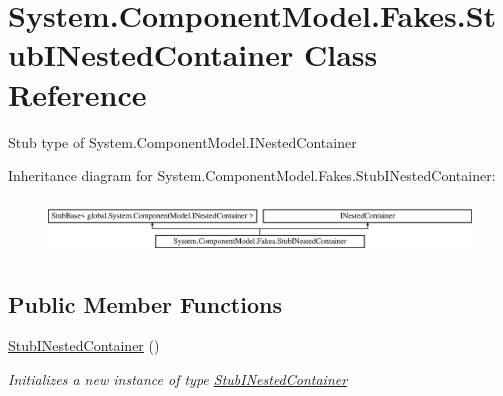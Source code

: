 \hypertarget{class_system_1_1_component_model_1_1_fakes_1_1_stub_i_nested_container}{\section{System.\-Component\-Model.\-Fakes.\-Stub\-I\-Nested\-Container Class Reference}
\label{class_system_1_1_component_model_1_1_fakes_1_1_stub_i_nested_container}
}


Stub type of System.\-Component\-Model.\-I\-Nested\-Container 


Inheritance diagram for System.\-Component\-Model.\-Fakes.\-Stub\-I\-Nested\-Container\-:\begin{figure}[H]
\begin{center}
\leavevmode
\includegraphics[height=1.481482cm]{class_system_1_1_component_model_1_1_fakes_1_1_stub_i_nested_container}
\end{center}
\end{figure}
\subsection*{Public Member Functions}
\begin{DoxyCompactItemize}
\item 
\hyperlink{class_system_1_1_component_model_1_1_fakes_1_1_stub_i_nested_container_a2a972d5db5450e0489c21e0832e07169}{Stub\-I\-Nested\-Container} ()
\begin{DoxyCompactList}\small\item\em Initializes a new instance of type \hyperlink{class_system_1_1_component_model_1_1_fakes_1_1_stub_i_nested_container}{Stub\-I\-Nested\-Container}\end{DoxyCompactList}\end{DoxyCompactItemize}
